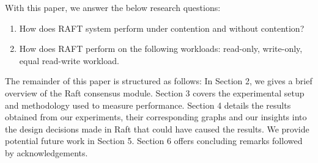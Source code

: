 With this paper, we answer the below research questions:
\begin{enumerate}
\item How does RAFT system perform under contention and without contention?
\item How does RAFT perform on the following workloads: read-only, write-only, equal read-write workload.
\end{enumerate}

The remainder of this paper is structured as follows: In Section 2, we gives a brief overview of the Raft consensus module. Section 3 covers the experimental setup and methodology used to measure performance. Section 4 details the results obtained from our experiments, their corresponding graphs and our insights into the design decisions made in Raft that could have caused the results. We provide potential future work in Section 5. Section 6 offers concluding remarks followed by acknowledgements.
